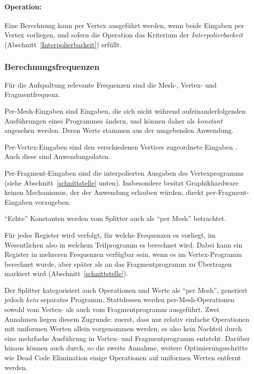 \documentclass[twoside,a4paper,fleqn,12pt]{article}
\begin{document}
\paragraph{Operation:} Eine Berechnung kann per Vertex ausgeführt werden, wenn beide Eingaben per Vertex vorliegen, und
sofern die Operation das Kriterium der \emph{Interpolierbarkeit} (Abschnitt~\ref{Interpolierbarkeit}) erfüllt.

\subsubsection{Berechnungsfrequenzen}
\label{splitter_Berechnungsfrequenzen}

Für die Aufspaltung relevante Frequenzen sind die Mesh-, %
Vertex- und Fragmentfrequenz.

Per-Mesh-Eingaben sind Eingaben, die sich nicht während aufeinanderfolgenden Ausführungen eines Programmes
ändern, und können daher als \emph{konstant} angesehen werden. Deren Werte stammen aus der umgebenden Anwendung.

Per-Vertex-Eingaben sind den verschiedenen Vertices zugeordnete Eingaben . %
Auch diese sind Anwendungsdaten.

Per-Fragment-Eingaben sind die interpolierten Ausgaben des Vertexprogramms (siehe Abschnitt~\ref{schnittstelle} unten). 
Insbesondere besitzt Graphikhardware keinen Mechanismus, der der Anwendung erlauben würden, direkt per-Fragment-Eingaben
vorzugeben.

"`Echte"' Konstanten werden vom Splitter auch als "`per Mesh"' betrachtet.

Für jedes Register wird verfolgt, für welche Frequenzen es vorliegt, im Wesentlichen also in welchem Teilprogramm es berechnet wird.
Dabei kann ein Register in mehreren Frequenzen verfügbar sein, wenn es im Vertex-Programm berechnet wurde, aber später als
an das Fragmentprogramm zu Übertragen markiert wird (Abschnitt~\ref{schnittstelle}).

Der Splitter kategorisiert auch Operationen und Werte als "`per Mesh"', generiert jedoch \emph{kein} separates Programm.
Stattdessen werden per-Mesh-Operationen sowohl vom Vertex- als auch vom Fragmentprogramm ausgeführt. Zwei Annahmen
liegen diesem Zugrunde: zuerst, dass nur relativ einfache Operationen mit uniformen Werten allein vorgenommen werden, es also kein
Nachteil durch eine mehrfache Ausführung in Vertex- und Fragmentprogramm entsteht. Darüber hinaus können auch durch, so die zweite Annahme,
weitere Optimierungsschritte wie Dead Code Elimination einige Operationen auf uniformen Werten entfernt werden.
\end{document}
